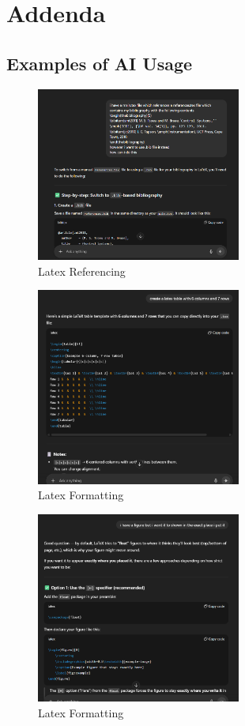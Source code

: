 \chapter{Addenda}

\section{Examples of AI Usage}

\begin{figure}[H]
    \centering
    \includegraphics[width=0.6\textwidth]{figures/AI_Usage/Bib_file.png}
    \caption{Latex Referencing}
\end{figure}

\begin{figure}[H]
    \centering
    \includegraphics[width=0.6\textwidth]{figures/AI_Usage/latex_table.png}
    \caption{Latex Formatting}
\end{figure}

\begin{figure}[H]
    \centering
    \includegraphics[width=0.6\textwidth]{figures/AI_Usage/latex_figure.png}
    \caption{Latex Formatting}
\end{figure}

